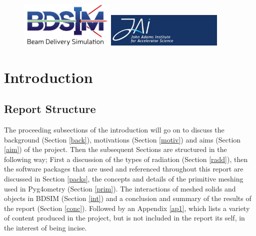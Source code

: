 \documentclass[12pt,a4paper]{article}
\begin{document}
\begin{titlepage}
\begin{figure}[h]
\centering
\begin{minipage}{.6\textwidth}
  \includegraphics[width=0.4\textwidth]{Images//Logos//BDSIM_Logo.jpg}
\end{minipage}%
\begin{minipage}{.6\textwidth}
  \centering
  \includegraphics[width=0.5\textwidth]{Images//Logos//JAI_Logo.jpeg}
  \end{minipage}
\end{figure}

\end{titlepage}
\leavevmode\thispagestyle{empty}\newpage
\tableofcontents
\normalsize
\thispagestyle{empty}
\newpage
\onecolumn

\small
\setcounter{page}{1}


\section{Introduction}

\subsection{Report Structure}
The proceeding subsections of the introduction will go on to discuss the background (Section \ref{back}), motivations (Section \ref{motiv}) and aims (Section \ref{aim}) of the project. Then the subsequent Sections are structured in the following way; First a discussion of the types of radiation (Section \ref{radd}), then the software packages that are used and referenced throughout this report are discussed in Section \ref{packs}, the concepts and details of the primitive meshing used in Pyg4ometry (Section \ref{prim}). The interactions of meshed solids and objects in BDSIM (Section \ref{int}) and a conclusion and summary of the results of the report (Section \ref{conc}). Followed by an Appendix \ref{ap1}, which lists a variety of content produced in the project, but is not included in the report its self, in the interest of being incise.
\end{document}
